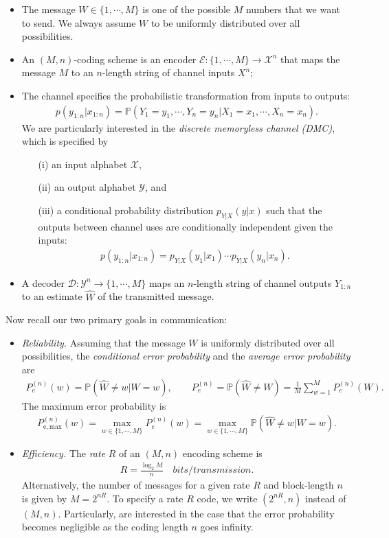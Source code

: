 \documentclass{article}
\numberwithin{equation}{section}
\newcommand{\bbP}{\mathbb{P}}
\renewcommand{\cal}{\mathcal}
\newcommand{\wh}{\widehat}
\theoremstyle{plain}
\theoremstyle{definition}
\begin{document}
\begin{itemize}
	\item The message $W\in\{1,\cdots,M\}$ is one of the possible $M$ numbers that we want to send. We always assume $W$ to be uniformly distributed over all possibilities.
	\item An $(M,n)$-coding scheme is an encoder $\cal{E}:\{1,\cdots,M\}\to\cal{X}^n$ that maps the message $M$ to an $n$-length string of channel inputs $X^n$;
	\item The channel specifies the probabilistic transformation from inputs to outputs:
	\begin{align*}
		p(y_{1:n}|x_{1:n})=\bbP\left(Y_1=y_1,\cdots,Y_n=y_n|X_1=x_1,\cdots,X_n=x_n\right).
	\end{align*}
We are particularly interested in the \textit{discrete memoryless channel (DMC)}, which is specified by 
\begin{itemize}
\item[(i)] an input alphabet $\cal{X}$, 
\item[(ii)] an output alphabet $\cal{Y}$, and 
\item[(iii)] a conditional probability distribution $p_{Y|X}(y|x)$ such that the outputs between channel uses are conditionally independent given the inputs:
\begin{align*}
	p(y_{1:n}|x_{1:n})=p_{Y|X}(y_1|x_1)\cdots p_{Y|X}(y_n|x_n).
\end{align*}
\end{itemize}
\item A decoder $\cal{D}:\cal{Y}^n\to\{1,\cdots,M\}$ maps an $n$-length string of channel outputs $Y_{1:n}$ to an estimate $\wh{W}$ of the transmitted message.
\end{itemize}
Now recall our two primary goals in communication:
\begin{itemize}
\item \textit{Reliability.} Assuming that the message $W$ is uniformly distributed over all possibilities, the \textit{conditional error probability} and the \textit{average error probability} are
\begin{align*}
	P_e^{(n)}(w)=\bbP(\wh{W}\neq w|W=w),\qquad P_e^{(n)}=\bbP(\wh{W}\neq W)=\frac{1}{M}\sum_{w=1}^M P_e^{(n)}(W).
\end{align*}
The maximum error probability is
\begin{align*}
	P_{\mathrm{e,max}}^{(n)}(w)=\max_{w\in\{1,\cdots,M\}}P_e^{(n)}(w)=\max_{w\in\{1,\cdots,M\}}\bbP(\wh{W}\neq w|W=w).
\end{align*}
\item \textit{Efficiency.} The \textit{rate} $R$ of an $(M,n)$ encoding scheme is
\begin{align*}
	R=\frac{\log_2 M}{n}\quad bits/transmission.
\end{align*}
Alternatively, the number of messages for a given rate $R$ and block-length $n$ is given by $M=2^{nR}$. To specify a rate $R$ code, we write $(2^{nR},n)$ instead of $(M, n)$. Particularly, are interested in the case that the error probability becomes negligible as the coding length $n$ goes infinity.
\end{itemize}
\end{document}
